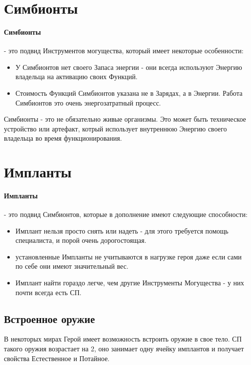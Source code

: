 \section{Симбионты}
\paragraph{Симбионты} - это подвид Инструментов могущества, который имеет некоторые особенности:
\begin{itemize}
\item У Симбионтов нет своего Запаса энергии - они всегда используют Энергию владельца на активацию своих Функций.
\item Стоимость Функций Симбионтов указана не в Зарядах, а в Энергии. Работа Симбионтов это очень энергозатратный процесс.
\end{itemize}
\begin{tcolorbox}
Симбионты - это не обязательно живые организмы. Это может быть техническое устройство или артефакт, котрый использует внутреннюю Энергию своего владельца во время функционирования.
\end{tcolorbox}

\tbd
\section{Импланты}
\paragraph{Импланты} - это подвид Симбионтов, которые в дополнение имеют следующие способности:
\begin{itemize}
\item Имплант нельзя просто снять или надеть - для этого требуется помощь специалиста, и порой очень дорогостоящая.
\item установленные Импланты не учитываются в нагрузке героя даже если сами по себе они имеют значительный вес.
\item Имплант найти гораздо легче, чем другие Инструменты Могущества - у них почти всегда есть СП.
\end{itemize}

\subsection{Встроенное оружие}
В некоторых мирах Герой имеет возможность встроить оружие в свое тело. СП такого оружия возрастает на 2, оно занимает одну ячейку имплантов и получает свойства Естественное и Потайное.

